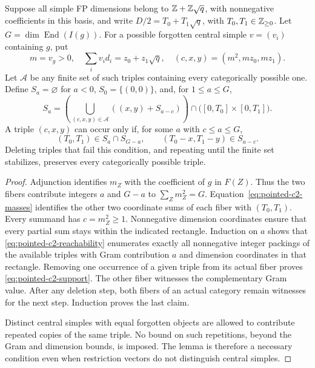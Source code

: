 \begin{lemma}
\label{lem:pointed-c2-packing}
Suppose all simple FP dimensions belong to $\mathbb Z+\mathbb Z\sqrt q$, with
nonnegative coefficients in this basis, and write
$D/2=T_0+T_1\sqrt q$, with $T_0,T_1\in\mathbb Z_{\ge0}$.
Let $G=\dim\operatorname{End}(I(g))$.
For a possible forgotten central simple $v=(v_i)$ containing $g$, put
\[
 m=v_g>0,\quad \sum_i v_i d_i=z_0+z_1\sqrt q,\quad
 (c,x,y)=(m^2,mz_0,mz_1).
\]
Let $\mathcal A$ be any finite set of such triples containing every
categorically possible one.  Define $S_a=\varnothing$ for $a<0$,
$S_0=\{(0,0)\}$, and, for $1\leq a\leq G$,
\begin{equation}\label{eq:pointed-c2-reachability}
 S_a=\left(\bigcup_{(c,x,y)\in\mathcal A}
       ((x,y)+S_{a-c})\right)
       \cap\bigl([0,T_0]\times[0,T_1]\bigr).
\end{equation}
A triple $(c,x,y)$ can occur only if, for some $a$ with $c\leq a\leq G$,
\begin{equation}\label{eq:pointed-c2-support}
 (T_0,T_1)\in S_a\cap S_{G-a},\qquad
 (T_0-x,T_1-y)\in S_{a-c}.
\end{equation}
Deleting triples that fail this condition, and repeating until the
finite set stabilizes, preserves every categorically possible triple.
\end{lemma}
\begin{proof}
Adjunction identifies $m_Z$ with the coefficient of $g$ in $F(Z)$.
Thus the two fibers contribute integers $a$ and $G-a$ to
$\sum_Zm_Z^2=G$.  Equation~\eqref{eq:pointed-c2-masses} identifies the
other two coordinate sums of each fiber with $(T_0,T_1)$.
Every summand has $c=m_Z^2\geq1$.  Nonnegative dimension coordinates
ensure that every partial sum stays within the indicated rectangle.
Induction on $a$ shows that \eqref{eq:pointed-c2-reachability} enumerates
exactly all nonnegative integer packings of the available triples
with Gram contribution $a$ and dimension coordinates in that rectangle.
Removing one occurrence of a given triple from its actual fiber proves
\eqref{eq:pointed-c2-support}.  The other fiber witnesses the complementary
Gram value.  After any deletion step, both fibers of an actual category
remain witnesses for the next step.  Induction proves the last claim.

Distinct central simples with equal forgotten objects are allowed to
contribute repeated copies of the same triple.  No bound on such
repetitions, beyond the Gram and dimension bounds, is imposed.  The
lemma is therefore a necessary condition even when restriction vectors
do not distinguish central simples.
\end{proof}

